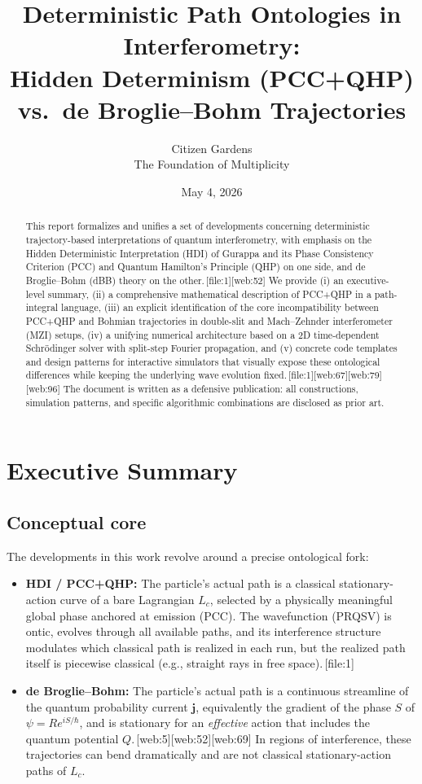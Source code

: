 \documentclass[11pt]{article}
\title{Deterministic Path Ontologies in Interferometry:\\
Hidden Determinism (PCC+QHP) vs.\ de Broglie--Bohm Trajectories\\[4pt]}
\author{Citizen Gardens \\ The Foundation of Multiplicity}
\date{May 4, 2026}
\begin{document}
\maketitle

\begin{abstract}
This report formalizes and unifies a set of developments concerning deterministic trajectory-based interpretations of quantum interferometry, with emphasis on the Hidden Deterministic Interpretation (HDI) of Gurappa and its Phase Consistency Criterion (PCC) and Quantum Hamilton's Principle (QHP) on one side, and de Broglie--Bohm (dBB) theory on the other.\,[file:1][web:52]
We provide (i) an executive-level summary, (ii) a comprehensive mathematical description of PCC+QHP in a path-integral language, (iii) an explicit identification of the core incompatibility between PCC+QHP and Bohmian trajectories in double-slit and Mach--Zehnder interferometer (MZI) setups, (iv) a unifying numerical architecture based on a 2D time-dependent Schr\"odinger solver with split-step Fourier propagation, and (v) concrete code templates and design patterns for interactive simulators that visually expose these ontological differences while keeping the underlying wave evolution fixed.\,[file:1][web:67][web:79][web:96]
The document is written as a defensive publication: all constructions, simulation patterns, and specific algorithmic combinations are disclosed as prior art.
\end{abstract}
\newpage
\tableofcontents

\section{Executive Summary}

\subsection{Conceptual core}

The developments in this work revolve around a precise ontological fork:

\begin{itemize}[leftmargin=*]
  \item \textbf{HDI / PCC+QHP:} The particle's actual path is a classical stationary-action curve of a bare Lagrangian \(L_c\), selected by a physically meaningful global phase anchored at emission (PCC). The wavefunction (PRQSV) is ontic, evolves through all available paths, and its interference structure modulates which classical path is realized in each run, but the realized path itself is piecewise classical (e.g., straight rays in free space).\,[file:1]

  \item \textbf{de Broglie--Bohm:} The particle's actual path is a continuous streamline of the quantum probability current \(\mathbf j\), equivalently the gradient of the phase \(S\) of \(\psi = R e^{iS/\hbar}\), and is stationary for an \emph{effective} action that includes the quantum potential \(Q\).\,[web:5][web:52][web:69]
  In regions of interference, these trajectories can bend dramatically and are not classical stationary-action paths of \(L_c\).
\end{itemize}
\end{document}
